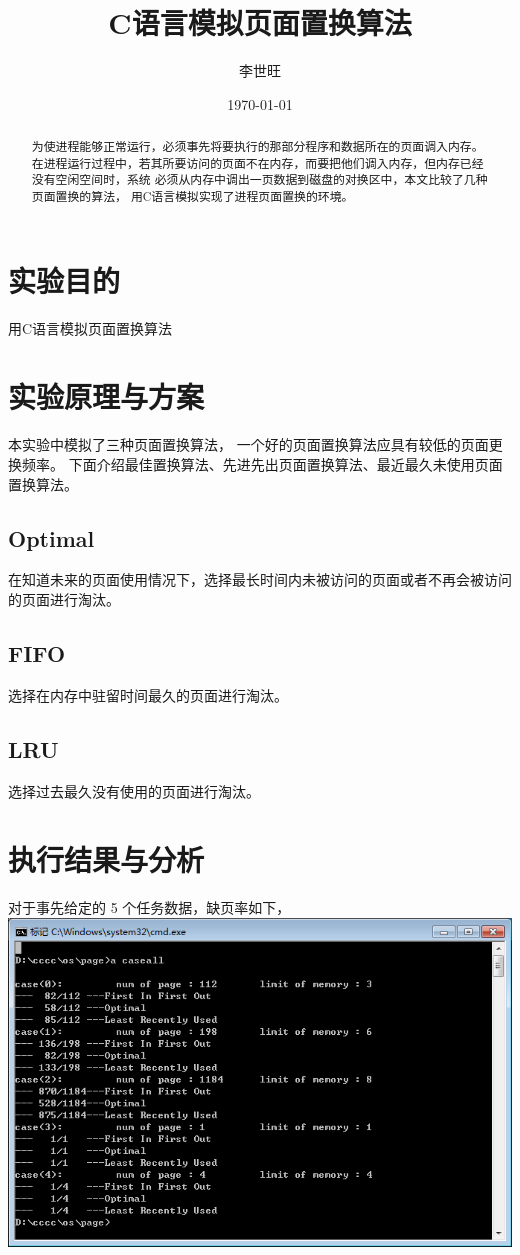 \documentclass[UTF8]{ctexart}
\title{C语言模拟页面置换算法}%
\author{李世旺}
\date{\today}
\begin{document}
\maketitle
\begin{abstract}
为使进程能够正常运行，必须事先将要执行的那部分程序和数据所在的页面调入内存。
在进程运行过程中，若其所要访问的页面不在内存，而要把他们调入内存，但内存已经没有空闲空间时，系统
必须从内存中调出一页数据到磁盘的对换区中，本文比较了几种页面置换的算法，
用C语言模拟实现了进程页面置换的环境。
\end{abstract}
\newpage
\tableofcontents
\newpage
\section{实验目的}
用C语言模拟页面置换算法
\section{实验原理与方案}
本实验中模拟了三种页面置换算法，
一个好的页面置换算法应具有较低的页面更换频率。
下面介绍最佳置换算法、先进先出页面置换算法、最近最久未使用页面置换算法。
\subsection{Optimal}
在知道未来的页面使用情况下，选择最长时间内未被访问的页面或者不再会被访问的页面进行淘汰。
\subsection{FIFO}
选择在内存中驻留时间最久的页面进行淘汰。
\subsection{LRU}
选择过去最久没有使用的页面进行淘汰。
\section{执行结果与分析}
对于事先给定的 5 个任务数据，缺页率如下，\newline
\includegraphics[scale = 0.7]{page.png}%
\newpage
\end{document}
